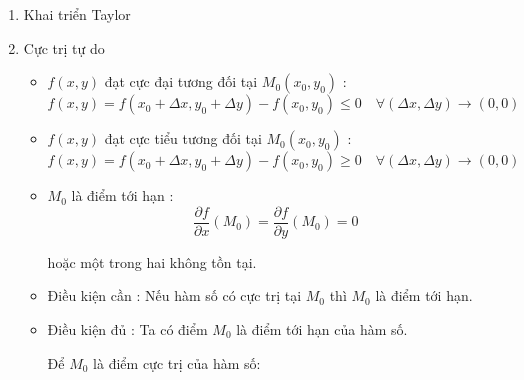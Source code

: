 \documentclass[15pt,a4paper]{report}
\begin{document}
{\begin{center}
\begin{enumerate}
            Ta có:
            \[\nabla f(x_{0}, y_{0}) = f'_{x}(x_{0}, y_{0}).\overrightarrow{i} + f'_{y}(x_{0}, y_{0}).\overrightarrow{j}\]
            \[\overrightarrow{grad}f(x_{0}, y_{0}) = (f'_{x}(x_{0}, y_{0}), f'_{y}(x_{0}, y_{0}))\]

            \[\rightarrow \dfrac{\partial f}{\partial \overrightarrow{u}} (x_{0}, y_{0}) = \nabla f(x_{0}, y_{0}) . \overrightarrow{u}\]
            \[= \left\lvert \nabla f(x_{0}, y_{0})\right\rvert.\left\lvert \overrightarrow{u} \right\rvert . \cos \alpha \quad : \left\lvert \overrightarrow{u} \right\rvert = 1\]
            
        \item Khai triển Taylor
       
            
   		\item Cực trị tự do
            \begin{itemize}
                \item $f(x, y)$ đạt cực đại tương đối tại $M_{0}(x_{0}, y_{0})$ :  
                    \[f(x, y) = f(x_{0} + \Delta x, y_{0} + \Delta y) - f(x_{0}, y_{0}) \leqslant 0 \quad \forall (\Delta x, \Delta y) \to (0, 0)
                    \] 
                \item  $f(x, y)$ đạt cực tiểu tương đối tại $M_{0}(x_{0}, y_{0})$ :  
                \[f(x, y) = f(x_{0} + \Delta x, y_{0} + \Delta y) - f(x_{0}, y_{0}) \geqslant  0 \quad \forall (\Delta x, \Delta y) \to (0, 0)
                \] 
                \item $M_{0}$ là điểm tới hạn :
                    \[\dfrac{\partial f}{\partial x}(M_{0}) = \dfrac{\partial f}{\partial y}(M_{0}) = 0\]

                    hoặc một trong hai không tồn tại.
                \item Điều kiện cần :
                    Nếu hàm số có cực trị tại $M_{0}$ thì $M_{0}$ là điểm tới hạn.
                \item Điều kiện đủ :
                    Ta có điểm $M_{0}$ là điểm tới hạn của hàm số.

                    Để $M_{0}$ là điểm cực trị của hàm số:


\end{itemize}
\end{enumerate}
\end{center}}
\end{document}
